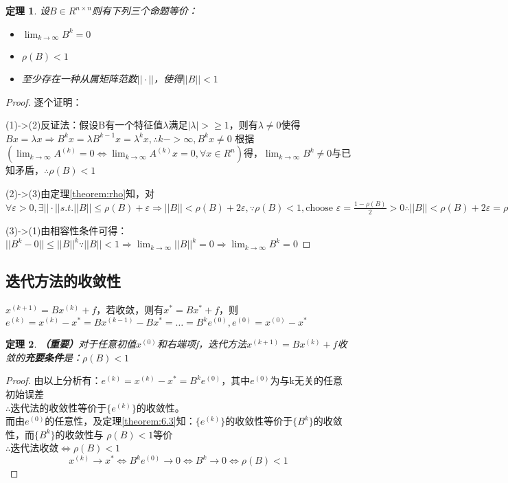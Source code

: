 \documentclass[a4paper]{article}
\newtheorem{theorem}{定理}[section]
\begin{document}
\begin{theorem}
  设$B\in R^{n\times n} $则有下列三个命题等价： 
  \begin{itemize}
    \item $\lim_{k\rightarrow \infty} B^k=0$
    \item $\rho(B)<1$
    \item 至少存在一种从属矩阵范数$||\cdot||$，使得$||B||<1$
  \end{itemize}
\end{theorem}

\begin{proof}
  逐个证明：

  (1)->(2)反证法：假设B有一个特征值$\lambda$满足$|\lambda|>\ge 1$，则有$\lambda \neq 0$使得$Bx=\lambda x\Rightarrow B^kx=\lambda B^{k-1}x=\lambda^kx,\therefore k->\infty,B^kx\neq 0 $
  根据$(\lim_{k\rightarrow \infty} A^{(k)}=0\Leftrightarrow \lim_{k\rightarrow \infty} A^{(k)}x=0, \forall x \in R^n )$得，$\lim_{k\rightarrow \infty} B^{k}\neq 0$与已知矛盾，$\therefore \rho(B)<1$

  (2)->(3)由定理\ref{theorem:rho}知，对$\forall \varepsilon >0, \exists ||\cdot|| s.t. ||B||\le \rho(B)+\varepsilon \Rightarrow ||B||<\rho(B)+2\varepsilon, \because \rho(B)<1, \text{choose\ } \varepsilon = \frac{1-\rho(B)}{2}>0
  \therefore ||B||<\rho(B)+2\varepsilon = \rho(B)+2\frac{1-\rho(B)}{2}=1 $

  (3)->(1)由相容性条件可得：$||B^k-0||\le ||B||^k \because ||B||<1 \Rightarrow \lim_{k\rightarrow \infty}||B||^k=0 \Rightarrow \lim_{k\rightarrow \infty}B^k=0 $
\end{proof}

\subsection{迭代方法的收敛性}
$x^{(k+1)}=Bx^{(k)}+f $，若收敛，则有$x^*=Bx^*+f$，则$e^{(k)}=x^{(k)}-x^*=Bx^{(k-1)}-Bx^*= \dots = B^ke^{(0)}, e^{(0)}=x^{(0)}-x^* $

\begin{theorem}
  \textbf{（重要）}对于任意初值$x^{(0)} $和右端项f，迭代方法$x^{(k+1)}=Bx^{(k)}+f $收敛的\textbf{充要条件}是：$\rho(B)<1$
\end{theorem}
\begin{proof}
  由以上分析有：$e^{(k)}=x^{(k)}-x^*= B^ke^{(0)}$，其中$e^{(0)}$为与k无关的任意初始误差\\
  $\therefore$迭代法的收敛性等价于$\{e^{(k)} \}$的收敛性。\\
  而由$e^{(0)}$的任意性，及定理\ref{theorem:6.3}知：$\{e^{(k)} \}$的收敛性等价于$\{B^k\}$的收敛性，而$\{B^k\}$的收敛性与
  $\rho(B)<1$等价\\
  $\therefore$迭代法收敛$\Leftrightarrow\rho(B)<1$
  $$x^{(k)}\rightarrow x^* \Leftrightarrow B^ke^{(0)}\rightarrow 0\Leftrightarrow B^k\rightarrow 0 \Leftrightarrow \rho(B)<1 $$
\end{proof}
\end{document}
